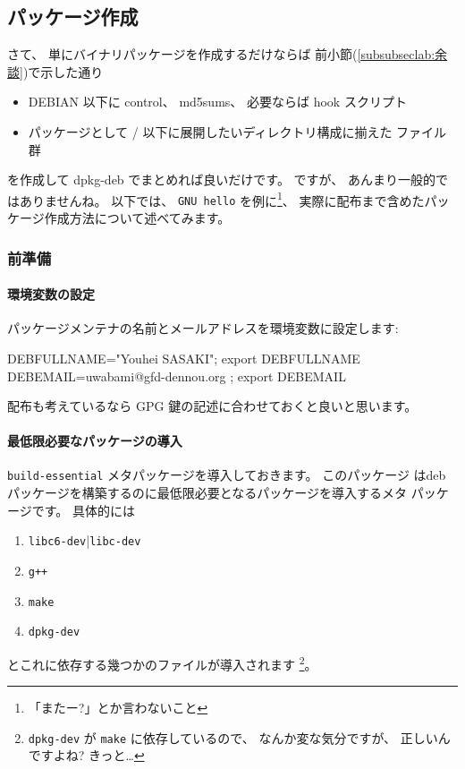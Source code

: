 \documentclass[mingoth,a4paper]{jsarticle}
\begin{document}
\subsection{パッケージ作成}

さて、 単にバイナリパッケージを作成するだけならば
前小節(\ref{subsubseclab:余談})で示した通り
\begin{itemize}
      \item DEBIAN 以下に control、 md5sums、 必要ならば hook スクリプト
      \item パッケージとして / 以下に展開したいディレクトリ構成に揃えた
    ファイル群
\end{itemize}
を作成して dpkg-deb でまとめれば良いだけです。 
%
ですが、 あんまり一般的ではありませんね。
%
以下では、 {\tt GNU hello} を例に\footnote{「またー?」とか言わないこと}、 
実際に配布まで含めたパッケージ作成方法について述べてみます。

\subsubsection{前準備} 

\paragraph{環境変数の設定}
パッケージメンテナの名前とメールアドレスを環境変数に設定します:
\begin{commandline}
DEBFULLNAME="Youhei SASAKI"; export DEBFULLNAME
DEBEMAIL=uwabami@gfd-dennou.org ; export DEBEMAIL
\end{commandline}
配布も考えているなら GPG 鍵の記述に合わせておくと良いと思います。

\paragraph{最低限必要なパッケージの導入}

{\tt build-essential} メタパッケージを導入しておきます。 このパッケージ
はdeb パッケージを構築するのに最低限必要となるパッケージを導入するメタ
パッケージです。 
%
具体的には
\begin{enumerate}
      \item {\tt libc6-dev}|{\tt libc-dev}
      \item {\tt g++}
      \item {\tt make}
      \item {\tt dpkg-dev}
\end{enumerate}
とこれに依存する幾つかのファイルが導入されます
\footnote{{\tt dpkg-dev} が {\tt make} に依存しているので、 
なんか変な気分ですが、 正しいんですよね? きっと…}。
\end{document}
